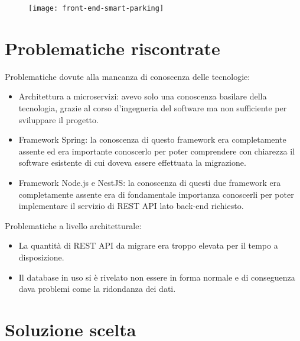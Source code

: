 \begin{figure}[!h]
    \centering
    \texttt{[image: front-end-smart-parking]}
\end{figure}

\section{Problematiche riscontrate}

Problematiche dovute alla mancanza di conoscenza delle tecnologie:
\begin{itemize}
    \item Architettura a microservizi: avevo solo una conoscenza basilare
          della tecnologia, grazie al corso d'ingegneria del software ma non
          sufficiente per sviluppare il progetto.
    \item Framework Spring: la conoscenza di questo framework era completamente assente
        ed era importante conoscerlo per poter comprendere con chiarezza il software esistente
        di cui doveva essere effettuata la migrazione.
    \item Framework Node.js e NestJS: la conoscenza di questi due framework era completamente
        assente era di fondamentale importanza conoscerli per poter implementare il servizio
        di REST API lato back-end richiesto.
\end{itemize}
\leavevmode\newline
Problematiche a livello architetturale:
\begin{itemize}
    \item La quantità di REST API da migrare era troppo elevata per il tempo a disposizione.
    \item Il database in uso si è rivelato non essere in forma normale e di conseguenza dava 
        problemi come la ridondanza dei dati.
\end{itemize}

\section{Soluzione scelta}

